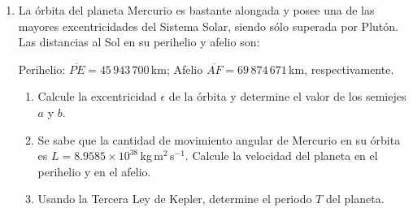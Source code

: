 \documentclass[a4paper,12pt]{article}
\begin{document}
\begin{enumerate}
\item La órbita del planeta Mercurio es bastante alongada y posee una de las mayores
excentricidades del Sistema Solar, siendo sólo superada por Plutón. Las
distancias al Sol en su perihelio y afelio son:

Perihelio: $\overline{PE} = 45\,943\,700$\,km; Afelio $\overline{AF} =
69\,874\,671$\,km, respectivamente.
\begin{enumerate}
\item Calcule la excentricidad $\epsilon$ de la órbita y determine el valor de
los semiejes $a$ y $b$.
\item Se sabe que la cantidad de movimiento angular de Mercurio en su órbita es $L = 8.9585
\times 10^{38}$\,kg\,m$^2$\,s$^{-1}$. Calcule la velocidad del planeta en el
perihelio y en el afelio.
\item Usando la Tercera Ley de Kepler, determine el periodo $T$ del planeta.
\end{enumerate}
\end{enumerate}
\end{document}
